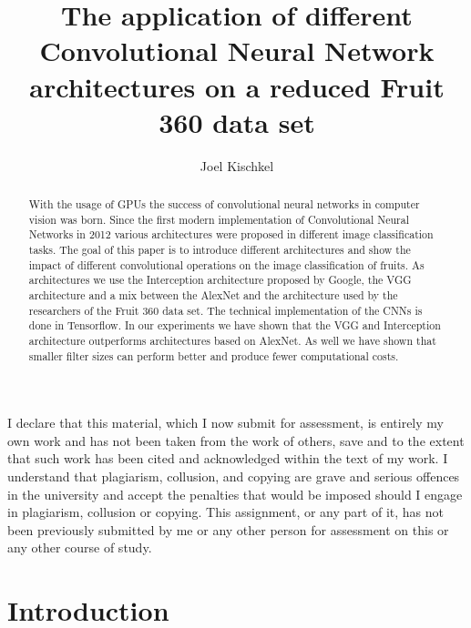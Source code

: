 \documentclass[11pt, a4paper]{article}
\begin{document}
\title{The application of different Convolutional Neural Network architectures on a reduced Fruit 360 data set}
\author{Joel Kischkel}


\maketitle

I declare that this material, which I now submit for assessment, is entirely my own work and has not been taken from the work of others, save and to the extent that such work has been cited and acknowledged within the text of my work. I understand that plagiarism, collusion, and copying are grave and serious offences in the university and accept the penalties that would be imposed should I engage in plagiarism, collusion or copying. This assignment, or any part of it, has not been previously submitted by me or any other person for assessment on this or any other course of study.

\begin{abstract}
With the usage of GPUs the success of convolutional neural networks in computer vision was born. Since the first modern implementation of Convolutional Neural Networks in 2012 various architectures were proposed in different image classification tasks. The goal of this paper is to introduce different architectures and show the impact of different convolutional operations on the image classification of fruits. As architectures we use the Interception architecture proposed by Google, the VGG architecture and a mix between the AlexNet and the architecture used by the researchers of the Fruit 360 data set. The technical implementation of the CNNs is done in Tensorflow. In our experiments we have shown that the VGG and Interception architecture outperforms architectures based on AlexNet. As well we have shown that smaller filter sizes can perform better and produce fewer computational costs. 
 
\end{abstract}

\section{Introduction}
\end{document}

